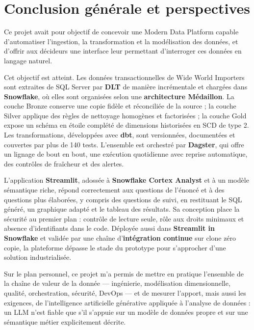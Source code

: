 \chapter*{Conclusion générale et perspectives}

Ce projet avait pour objectif de concevoir une Modern Data Platform capable d'automatiser l'ingestion,
la transformation et la modélisation des données, et d'offrir aux décideurs une interface leur
permettant d'interroger ces données en langage naturel.

Cet objectif est atteint. Les données transactionnelles de Wide World Importers sont extraites de
SQL Server par \textbf{DLT} de manière incrémentale et chargées dans \textbf{Snowflake}, où elles sont
organisées selon une \textbf{architecture Médaillon}. La couche Bronze conserve une copie fidèle et
réconciliée de la source ; la couche Silver applique des règles de nettoyage homogènes et factorisées ;
la couche Gold expose un schéma en étoile complété de dimensions historisées en SCD de type 2. Les
transformations, développées avec \textbf{dbt}, sont versionnées, documentées et couvertes par plus de
140 tests. L'ensemble est orchestré par \textbf{Dagster}, qui offre un lignage de bout en bout, une
exécution quotidienne avec reprise automatique, des contrôles de fraîcheur et des alertes.

L'application \textbf{Streamlit}, adossée à \textbf{Snowflake Cortex Analyst} et à un modèle sémantique
riche, répond correctement aux questions de l'énoncé et à des questions plus élaborées, y compris des
questions de suivi, en restituant le SQL généré, un graphique adapté et le tableau des résultats. Sa
conception place la sécurité au premier plan : contrôle de lecture seule, rôle aux droits minimaux et
absence d'identifiants dans le code. Déployée aussi dans \textbf{Streamlit in Snowflake} et validée par
une chaîne d'\textbf{intégration continue} sur clone zéro copie, la plateforme dépasse le stade du
prototype pour s'approcher d'une solution industrialisée.

Sur le plan personnel, ce projet m'a permis de mettre en pratique l'ensemble de la chaîne de valeur de
la donnée --- ingénierie, modélisation dimensionnelle, qualité, orchestration, sécurité, DevOps --- et
de mesurer l'apport, mais aussi les exigences, de l'intelligence artificielle générative appliquée à
l'analyse de données : un LLM n'est fiable que s'il s'appuie sur un modèle de données propre et sur
une sémantique métier explicitement décrite.


